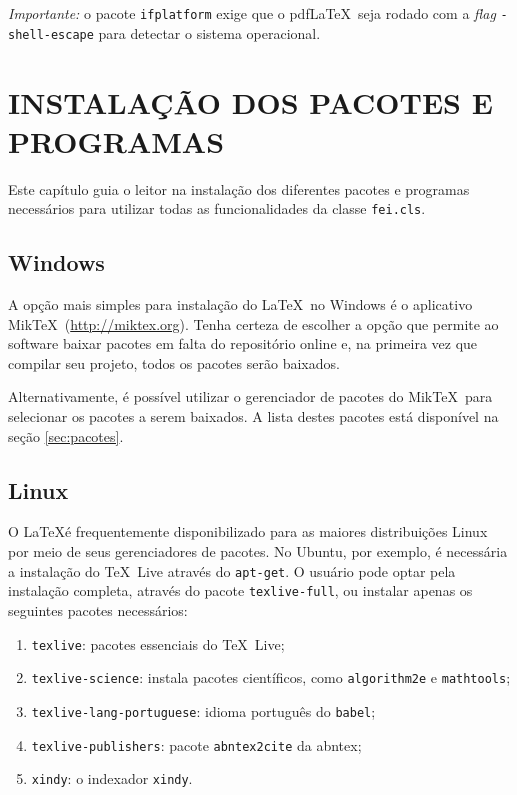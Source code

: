 \documentclass{fei}
\begin{document}
	\emph{Importante:} o pacote \texttt{ifplatform} exige que o pdf\LaTeX\ seja rodado com a \emph{flag} \texttt{-shell-escape} para detectar o sistema operacional.
	
	\chapter{INSTALAÇÃO DOS PACOTES E PROGRAMAS}	\label{chap:instalacao}
	
	Este capítulo guia o leitor na instalação dos diferentes pacotes e programas necessários para utilizar todas as funcionalidades da classe \texttt{fei.cls}.
	
	\section{Windows}
	
	A opção mais simples para instalação do \LaTeX\ no Windows é o aplicativo Mik\TeX\ (\url{http://miktex.org}). Tenha certeza de escolher a opção que permite ao software baixar pacotes em falta do repositório online e, na primeira vez que compilar seu projeto, todos os pacotes serão baixados.
	
	Alternativamente, é possível utilizar o gerenciador de pacotes do Mik\TeX\ para selecionar os pacotes a serem baixados. A lista destes pacotes está disponível na seção \ref{sec:pacotes}.
	
	\section{Linux}
	
	O \LaTeX é frequentemente disponibilizado para as maiores distribuições Linux por meio de seus gerenciadores de pacotes. No Ubuntu, por exemplo, é necessária a instalação do \TeX\ Live através do \texttt{apt-get}. O usuário pode optar pela instalação completa, através do pacote \texttt{texlive-full}, ou instalar apenas os seguintes pacotes necessários:
	
	\begin{enumerate}
	\item \texttt{texlive}: pacotes essenciais do \TeX\ Live;
	\item \texttt{texlive-science}: instala pacotes científicos, como \texttt{algorithm2e} e \texttt{mathtools};
	\item \texttt{texlive-lang-portuguese}: idioma português do \texttt{babel};
	\item \texttt{texlive-publishers}: pacote \texttt{abntex2cite} da \gls{abntex};
	\item {}\texttt{xindy}: o indexador \texttt{xindy}.
	\end{enumerate}
\end{document}
